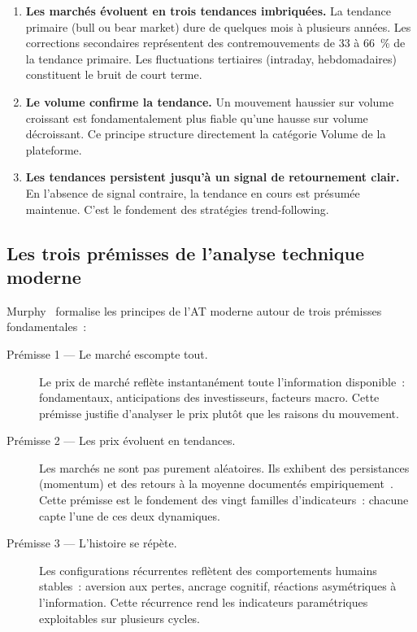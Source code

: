 \begin{enumerate}
    \item \textbf{Les marchés évoluent en trois tendances imbriquées.}
    La tendance primaire (bull ou bear market) dure de quelques mois à plusieurs années.
    Les corrections secondaires représentent des contremouvements de 33 à 66~\% de la
    tendance primaire. Les fluctuations tertiaires (intraday, hebdomadaires) constituent
    le bruit de court terme.

    \item \textbf{Le volume confirme la tendance.}
    Un mouvement haussier sur volume croissant est fondamentalement plus fiable qu'une
    hausse sur volume décroissant. Ce principe structure directement la catégorie Volume
    de la plateforme.

    \item \textbf{Les tendances persistent jusqu'à un signal de retournement clair.}
    En l'absence de signal contraire, la tendance en cours est présumée maintenue.
    C'est le fondement des stratégies trend-following.
\end{enumerate}

\subsection{Les trois prémisses de l'analyse technique moderne}

Murphy~\cite{murphy1999} formalise les principes de l'AT moderne autour de trois
prémisses fondamentales~:

\begin{description}
    \item[Prémisse 1 — Le marché escompte tout.]
    Le prix de marché reflète instantanément toute l'information disponible~:
    fondamentaux, anticipations des investisseurs, facteurs macro. Cette prémisse
    justifie d'analyser le prix plutôt que les raisons du mouvement.

    \item[Prémisse 2 — Les prix évoluent en tendances.]
    Les marchés ne sont pas purement aléatoires. Ils exhibent des persistances
    (momentum) et des retours à la moyenne documentés empiriquement~\cite{harvey2016}.
    Cette prémisse est le fondement des vingt familles d'indicateurs~: chacune capte
    l'une de ces deux dynamiques.

    \item[Prémisse 3 — L'histoire se répète.]
    Les configurations récurrentes reflètent des comportements humains stables~:
    aversion aux pertes, ancrage cognitif, réactions asymétriques à l'information.
    Cette récurrence rend les indicateurs paramétriques exploitables sur plusieurs cycles.
\end{description}

